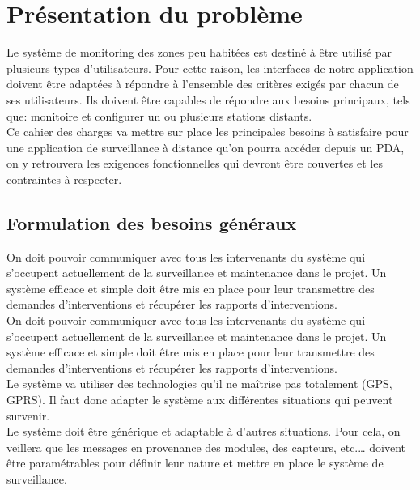 
\section{Présentation du problème}



Le système de monitoring des zones peu habitées est destiné à être utilisé par plusieurs types 
d'utilisateurs. Pour cette raison, les interfaces de notre application doivent être adaptées à 
répondre à l'ensemble des critères exigés par chacun de ses utilisateurs.
Ils doivent être capables de répondre aux besoins principaux, tels que: monitoire et configurer 
un ou plusieurs stations distants.\\


Ce cahier des charges va mettre sur place les principales besoins à satisfaire pour une application 
de surveillance à distance qu'on pourra accéder depuis un PDA, on y retrouvera les exigences 
fonctionnelles qui devront être couvertes et les contraintes à respecter.


\subsection{Formulation des besoins généraux}


On doit pouvoir communiquer avec tous les intervenants du système qui s'occupent actuellement de 
la surveillance et maintenance dans le projet. Un système efficace et simple doit être mis en place 
pour leur transmettre des demandes d'interventions et récupérer les rapports d'interventions.\\

On doit pouvoir communiquer avec tous les intervenants du système qui s'occupent actuellement de la surveillance et maintenance dans le projet. Un système efficace et simple doit être mis en place pour leur transmettre des demandes d'interventions et récupérer les rapports d'interventions.\\


Le système va utiliser des technologies qu'il ne maîtrise pas totalement (GPS, GPRS). Il faut donc 
adapter le système aux différentes situations qui peuvent survenir.\\

Le système doit être générique et adaptable à d’autres situations. Pour cela, on veillera que les 
messages en provenance des modules, des capteurs, etc.… doivent être paramétrables pour définir 
leur nature et mettre en place le système de surveillance.\\

